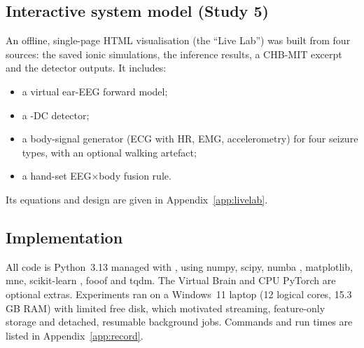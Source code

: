 \subsection{Interactive system model (Study 5)}
\label{sec:m-live}

An offline, single-page HTML visualisation (the ``Live Lab'') was built from four sources: the saved ionic simulations, the inference results, a CHB-MIT excerpt and the detector outputs. It includes:
\begin{itemize}
\item a virtual ear-EEG forward model;
\item a \Kp-DC detector;
\item a body-signal generator (ECG with HR, EMG, accelerometry) for four seizure types, with an optional walking artefact;
\item a hand-set EEG$\times$body fusion rule.
\end{itemize}
Its equations and design are given in Appendix~\ref{app:livelab}.

\subsection{Implementation}

All code is Python~3.13 managed with , using numpy, scipy, numba \cite{lam2015}, matplotlib, mne, scikit-learn \cite{pedregosa2011}, fooof and tqdm. The Virtual Brain and CPU PyTorch \cite{paszke2019} are optional extras. Experiments ran on a Windows~11 laptop (12 logical cores, 15.3\,GB RAM) with limited free disk, which motivated streaming, feature-only storage and detached, resumable background jobs. Commands and run times are listed in Appendix~\ref{app:record}.
